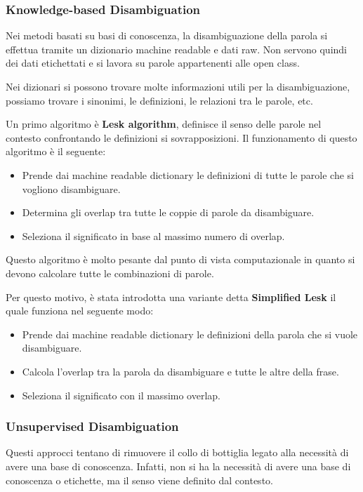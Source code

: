 \subsubsection{Knowledge-based Disambiguation}
Nei metodi basati su basi di conoscenza, la disambiguazione della parola si
effettua tramite un dizionario machine readable e dati raw. Non servono quindi
dei dati etichettati e si lavora su parole appartenenti alle open class.

Nei dizionari si possono trovare molte informazioni utili per la disambiguazione,
possiamo trovare i sinonimi, le definizioni, le relazioni tra le parole, etc.

Un primo algoritmo è \textbf{Lesk algorithm}, definisce il senso delle parole
nel contesto confrontando le definizioni si sovrapposizioni. Il funzionamento di
questo algoritmo è il seguente:
\begin{itemize}
      \item Prende dai machine readable dictionary le definizioni di tutte le
            parole che si vogliono disambiguare.
      \item Determina gli overlap tra tutte le coppie di parole da disambiguare.
      \item Seleziona il significato in base al massimo numero di overlap.
\end{itemize}
Questo algoritmo è molto pesante dal punto di vista computazionale in quanto
si devono calcolare tutte le combinazioni di parole.

Per questo motivo, è stata introdotta una variante detta \textbf{Simplified Lesk}
il quale funziona nel seguente modo:
\begin{itemize}
      \item Prende dai machine readable dictionary le definizioni della parola
            che si vuole disambiguare.
      \item Calcola l'overlap tra la parola da disambiguare e tutte le altre
            della frase.
      \item Seleziona il significato con il massimo overlap.
\end{itemize}
\subsubsection{Unsupervised Disambiguation}
Questi approcci tentano di rimuovere il collo di bottiglia legato alla necessità
di avere una base di conoscenza. Infatti, non si ha la necessità di avere una
base di conoscenza o etichette, ma il senso viene definito dal contesto.

